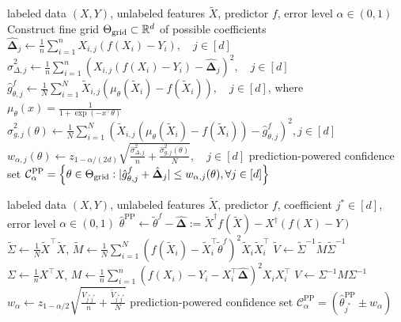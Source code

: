 \documentclass[10pt]{article}
\newcommand{\Xa}{X}
\newcommand{\Xt}{\widetilde{X}}
\newcommand{\Ya}{Y}
\newcommand{\thetaf}{\tilde{\theta}^{f}}
\newcommand{\thetaPP}{\hat{\theta}^{\mathrm{PP}}}
\newcommand{\rechat}{\hat{\mathbf{\Delta}}}
\newcommand{\CPP}{\mathcal{C}^{\mathrm{PP}}}
\begin{document}
\vspace{-.4cm}



\begin{algorithm}[H]
\caption{Prediction-powered logistic regression}
\label{alg:logistic}
\begin{algorithmic}[1]
\Require labeled data $(\Xa, \Ya)$, unlabeled features $\Xt$, predictor $f$, error level $\alpha \in(0,1)$ 
\State Construct fine grid $\Theta_{\rm grid} \subset \mathbb{R}^d$ of possible coefficients
\State $\rechat_j \leftarrow \frac{1}{n}\sum_{i=1}^n X_{i,j}(f(X_i) - Y_i), \quad j\in[d]$ 
\State $\hat \sigma_{\Delta,j}^2 \leftarrow \frac{1}{n}\sum_{i=1}^n\left(X_{i,j}(f(X_i) - Y_i) - \rechat_j\right)^2, \quad j\in[d]$ 
\State $\hat g^f_{\theta, j} \leftarrow \frac{1}{N}\sum_{i=1}^N \Xt_{i,j}\left(\mu_\theta(\Xt_i) - f(\Xt_i)\right), \quad j\in [d]$, \quad where $\mu_\theta(x) = \frac{1}{1+\exp(-x^\top \theta)}$ 
\State $\hat \sigma_{g,j}^2(\theta) \leftarrow \frac{1}{N}\sum_{i=1}^N(\Xt_{i,j}(\mu_\theta(\Xt_i) - f(\Xt_i)) - \hat g_{\theta,j}^f)^2, j\in[d]$  
\State $w_{\alpha,j}(\theta) \leftarrow z_{1-\alpha/(2d)} \sqrt{ \frac{\hat\sigma_{\Delta,j}^2}{n} +  \frac{\hat \sigma_{g,j}^2(\theta)}{N}}, \quad j\in[d]$ 
\EndFor
\Ensure 
prediction-powered confidence set $\CPP_\alpha = \left\{\theta\in \Theta_{\rm grid}:  |\hat g^f_{\theta, j}  + \rechat_j| \leq w_{\alpha,j}(\theta), \forall j\in[d] \right\}$
\end{algorithmic}
\end{algorithm}

\vspace{-.4cm}

\begin{algorithm}[H]
\caption{Prediction-powered linear regression}
\label{alg:ols}
\begin{algorithmic}[1]
\Require labeled data $(X, Y)$, unlabeled features $\Xt$, predictor $f$, coefficient $j^*\in[d]$, error level $\alpha\in(0,1)$
\State $\thetaPP \leftarrow \thetaf - \rechat := \Xt^\dagger f(\Xt) - X^\dagger (f(X) - Y)$ 
\State $\tilde \Sigma \leftarrow \frac 1 N \Xt^\top \Xt$, $\tilde M \leftarrow \frac 1 N \sum_{i=1}^N (f(\Xt_i) - \Xt_i^\top  \thetaf)^2 \Xt_i \Xt_i^\top$
\State $\tilde V \leftarrow \tilde\Sigma^{-1}\tilde M \tilde \Sigma^{-1}$ 
\State $\Sigma \leftarrow \frac 1 n X^\top X$,  $M\leftarrow \frac 1 n \sum_{i=1}^n (f(X_i) - Y_i - X_i^\top  \rechat)^2 X_i X_i^\top$
\State $V \leftarrow \Sigma^{-1} M  \Sigma^{-1}$ 
\State $w_\alpha \leftarrow z_{1-\alpha/2} \sqrt{ \frac{ V_{j^*j^*}}{n} + \frac{\tilde V_{j^*j^*}}{N}}$ 
\Ensure 
prediction-powered confidence set $\CPP_\alpha = \left(\thetaPP_{j^*} \pm w_\alpha\right)$
\end{algorithmic}
\end{algorithm}
\end{document}
